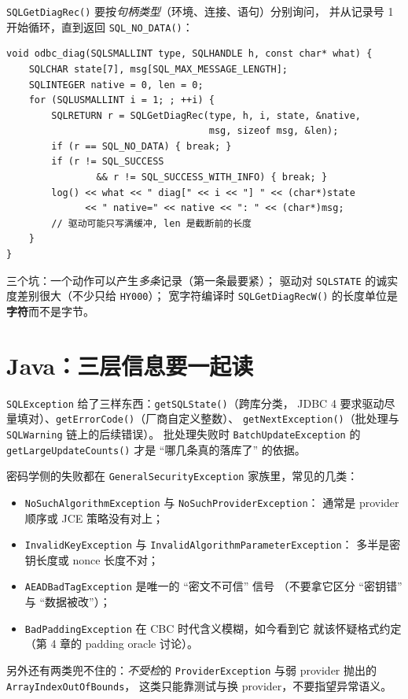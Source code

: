 \documentclass[12pt,a4paper,fontset=fandol]{ctexbook}
\newcommand{\Fn}[1]{\texttt{#1()}}
\newcommand{\Tp}[1]{\texttt{#1}}
\begin{document}
\Fn{SQLGetDiagRec} 要按\emph{句柄类型}（环境、连接、语句）分别询问，
并从记录号 1 开始循环，直到返回 \Fn{SQL\_NO\_DATA}：

\begin{lstlisting}[caption={C/C++：ODBC 诊断记录的多条循环取法}]
void odbc_diag(SQLSMALLINT type, SQLHANDLE h, const char* what) {
    SQLCHAR state[7], msg[SQL_MAX_MESSAGE_LENGTH];
    SQLINTEGER native = 0, len = 0;
    for (SQLUSMALLINT i = 1; ; ++i) {
        SQLRETURN r = SQLGetDiagRec(type, h, i, state, &native,
                                    msg, sizeof msg, &len);
        if (r == SQL_NO_DATA) { break; }
        if (r != SQL_SUCCESS
                && r != SQL_SUCCESS_WITH_INFO) { break; }
        log() << what << " diag[" << i << "] " << (char*)state
              << " native=" << native << ": " << (char*)msg;
        // 驱动可能只写满缓冲, len 是截断前的长度
    }
}
\end{lstlisting}

三个坑：一个动作可以产生\emph{多条}记录（第一条最要紧）；
驱动对 \Tp{SQLSTATE} 的诚实度差别很大（不少只给 \Tp{HY000}）；
宽字符编译时 \Fn{SQLGetDiagRecW} 的长度单位是\textbf{字符}而不是字节。

\section{Java：三层信息要一起读}

\Tp{SQLException} 给了三样东西：\Fn{getSQLState}（跨库分类，
JDBC 4 要求驱动尽量填对）、\Fn{getErrorCode}（厂商自定义整数）、
\Fn{getNextException}（批处理与 \Tp{SQLWarning} 链上的后续错误）。
批处理失败时 \Tp{BatchUpdateException} 的 \Fn{getLargeUpdateCounts}
才是 ``哪几条真的落库了'' 的依据。

密码学侧的失败都在 \Tp{GeneralSecurityException} 家族里，常见的几类：
\begin{itemize}
  \item \Tp{NoSuchAlgorithmException} 与 \Tp{NoSuchProviderException}：
        通常是 provider 顺序或 JCE 策略没有对上；
  \item \Tp{InvalidKeyException} 与
        \Tp{Invalid\allowbreak Algorithm\allowbreak Parameter\allowbreak Exception}：
        多半是密钥长度或 nonce 长度不对；
  \item \Tp{AEADBadTagException} 是唯一的 ``密文不可信'' 信号
        （不要拿它区分 ``密钥错'' 与 ``数据被改''）；
  \item \Tp{BadPaddingException} 在 CBC 时代含义模糊，如今看到它
        就该怀疑格式约定（第 4 章的 padding oracle 讨论）。
\end{itemize}
另外还有两类兜不住的：\emph{不受检}的 \Tp{Provider\allowbreak{}Exception}
与弱 provider 抛出的 \Tp{Array\allowbreak{}Index\allowbreak{}Out\allowbreak{}Of\allowbreak{}Bounds}，
这类只能靠测试与换 provider，不要指望异常语义。
\end{document}
